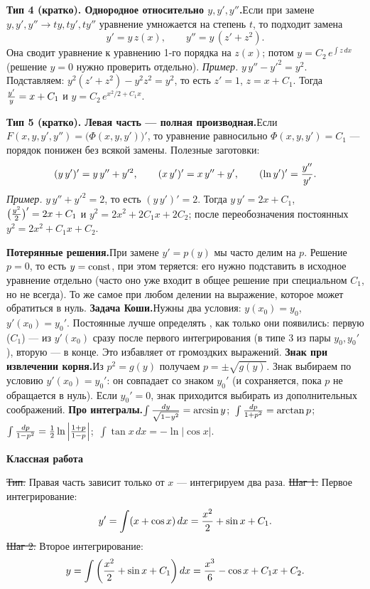 {\bf Тип 4 (кратко). Однородное относительно $y,y',y''$.}\quad Если при замене
$y,y',y''\to ty,ty',ty''$ уравнение умножается на степень $t$, то подходит
замена
$$y'=y\,z(x),\qquad y''=y\,(z'+z^2).$$
Она сводит уравнение к уравнению 1-го порядка на $z(x)$; потом
$y=C_2\,e^{\int z\,dx}$ (решение $y=0$ нужно проверить отдельно).
\smallskip
{\it Пример.} $y\,y''-y'^2=y^2$. Подставляем:
$y^2(z'+z^2)-y^2z^2=y^2$, то есть $z'=1$, $z=x+C_1$. Тогда
${y'\over y}=x+C_1$ и $y=C_2\,e^{x^2/2+C_1x}$.
\medskip

{\bf Тип 5 (кратко). Левая часть --- полная производная.}\quad Если
$F(x,y,y',y'')=\bigl(\Phi(x,y,y')\bigr)'$, то уравнение равносильно
$\Phi(x,y,y')=C_1$ --- порядок понижен без всякой замены. Полезные заготовки:
$$(y\,y')'=y\,y''+y'^2,\qquad (x\,y')'=x\,y''+y',\qquad
(\ln y')'={y''\over y'}.$$
{\it Пример.} $y\,y''+y'^2=2$, то есть $(y\,y')'=2$. Тогда $y\,y'=2x+C_1$,
$\bigl({y^2\over 2}\bigr)'=2x+C_1$ и $y^2=2x^2+2C_1x+2C_2$; после
переобозначения постоянных $y^2=2x^2+C_1x+C_2$.
\medskip

{\bf Потерянные решения.}\quad При замене $y'=p(y)$ мы часто делим на $p$.
Решение $p=0$, то есть $y=\hbox{const}$, при этом теряется: его нужно
подставить в исходное уравнение отдельно (часто оно уже входит в общее
решение при специальном $C_1$, но не всегда). То же самое при любом
делении на выражение, которое может обратиться в нуль.
\smallskip
{\bf Задача Коши.}\quad Нужны два условия: $y(x_0)=y_0$, $y'(x_0)=y_0'$.
Постоянные лучше определять , как только они появились: первую
($C_1$) --- из $y'(x_0)$ сразу после первого интегрирования (в типе 3 из пары
$y_0,y_0'$), вторую --- в конце. Это избавляет от громоздких выражений.
\smallskip
{\bf Знак при извлечении корня.}\quad Из $p^2=g(y)$ получаем
$p=\pm\sqrt{g(y)}$. Знак выбираем по условию $y'(x_0)=y_0'$: он совпадает со
знаком $y_0'$ (и сохраняется, пока $p$ не обращается в нуль). Если
$y_0'=0$, знак приходится выбирать из дополнительных соображений.
\smallskip
{\bf Про интегралы.}\quad $\int{dy\over\sqrt{1-y^2}}=\arcsin y$;\
$\int{dp\over1+p^2}=\arctan p$;\ $\int{dp\over1-p^2}={1\over2}\ln\left|{1+p\over1-p}\right|$;\
$\int\tan x\,dx=-\ln|\cos x|$.

\vfil\eject

\centerline{\bf Классная работа}
\bigskip

\st{Тип.} Правая часть зависит только от $x$ --- интегрируем два раза.
\st{Шаг 1.} Первое интегрирование:
$$y'=\int(x+\cos x)\,dx={x^2\over2}+\sin x+C_1.$$
\st{Шаг 2.} Второе интегрирование:
$$y=\int\left({x^2\over2}+\sin x+C_1\right)dx={x^3\over6}-\cos x+C_1x+C_2.$$
\ans{y={x^3\over6}-\cos x+C_1x+C_2}

